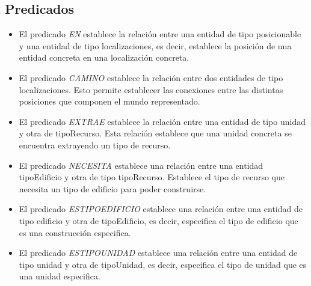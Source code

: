 \subsection{Predicados}
\begin{itemize}
   \item El predicado \textit{EN} establece la relación entre una entidad de tipo posicionable y una entidad de tipo localizaciones, es decir, establece la posición de una entidad concreta en una localización concreta.
   \item El predicado \textit{CAMINO} establece la relación entre dos entidades de tipo localizaciones. Esto permite establecer las conexiones entre las distintas posiciones que componen el mundo representado.
   \item El predicado \textit{EXTRAE} establece la relación entre una entidad de tipo unidad y otra de tipoRecurso. Esta relación establece que una unidad concreta se encuentra extrayendo un tipo de recurso.
   \item El predicado \textit{NECESITA} establece una relación entre una entidad tipoEdificio y otra de tipo tipoRecurso. Establece el tipo de recurso que necesita un tipo de edificio para poder construirse.
   \item El predicado \textit{ESTIPOEDIFICIO} establece una relación entre una entidad de tipo edificio y otra de tipoEdificio, es decir, especifica el tipo de edificio que es una construcción especifica.
   \item El predicado \textit{ESTIPOUNIDAD} establece una relación entre una entidad de tipo unidad y otra de tipoUnidad, es decir, especifica el tipo de unidad que es una unidad especifica.
\end{itemize}

